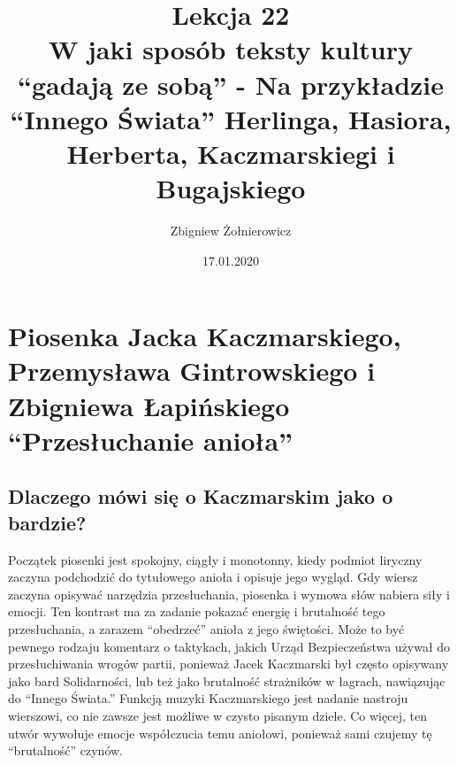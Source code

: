 \documentclass[a4paper]{article}
\begin{document}
\title{{\huge Lekcja 22} \\
{\large W jaki sposób teksty kultury ``gadają ze sobą'' - Na przykładzie ``Innego Świata'' Herlinga, Hasiora, Herberta, Kaczmarskiegi i Bugajskiego}}
\author{Zbigniew Żołnierowicz}
\date{17.01.2020}
\maketitle
\section{Piosenka Jacka Kaczmarskiego, Przemysława Gintrowskiego i Zbigniewa Łapińskiego ``Przesłuchanie anioła''}
\subsection{Dlaczego mówi się o Kaczmarskim jako o bardzie?}
Początek piosenki jest spokojny, ciągły i monotonny, kiedy podmiot liryczny zaczyna podchodzić do tytułowego anioła i opisuje jego wygląd.
Gdy wiersz zaczyna opisywać narzędzia przesłuchania, piosenka i wymowa słów nabiera siły i emocji.
Ten kontrast ma za zadanie pokazać energię i brutalność tego przesłuchania, a zarazem ``obedrzeć'' anioła z jego świętości.
Może to być pewnego rodzaju komentarz o taktykach, jakich Urząd Bezpieczeństwa używał do przesłuchiwania wrogów partii, ponieważ Jacek Kaczmarski był często opisywany jako bard Solidarności, lub też jako brutalność strażników w łagrach, nawiązując do ``Innego Świata.''
Funkcją muzyki Kaczmarskiego jest nadanie nastroju wierszowi, co nie zawsze jest możliwe w czysto pisanym dziele. Co więcej, ten utwór wywołuje emocje współczucia temu aniołowi, ponieważ sami czujemy tę ``brutalność'' czynów.
\end{document}
